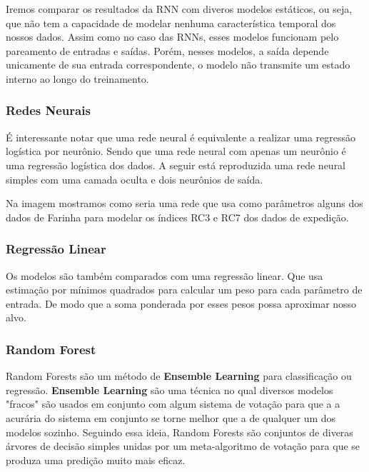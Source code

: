 \documentclass[a4paper]{article}
\begin{document}
Iremos comparar os resultados da RNN com diveros modelos estáticos, ou seja, que não tem a capacidade de modelar nenhuma característica temporal dos nossos dados. Assim como no caso das RNNs, esses modelos funcionam pelo pareamento de entradas e saídas. Porém, nesses modelos, a saída depende unicamente de sua entrada correspondente, o modelo não transmite um estado interno ao longo do treinamento.



\subsubsection{Redes Neurais}




É interessante notar que uma rede neural é equivalente a realizar uma regressão logística por neurônio. Sendo que uma rede neural com apenas um neurônio é uma regressão logística dos dados. A seguir está reproduzida uma rede neural simples com uma camada oculta e dois neurônios de saída.








Na imagem mostramos como seria uma rede que usa como parâmetros alguns dos dados de Farinha para modelar os índices RC3 e RC7 dos dados de expedição.

\bigskip
\subsubsection{Regressão Linear}
Os modelos são também comparados com uma regressão linear. Que usa estimação por mínimos quadrados para calcular um peso para cada parâmetro de entrada. De modo que a soma ponderada por esses pesos possa aproximar nosso alvo.


\subsubsection{Random Forest}

Random Forests são um método de \textbf{Ensemble Learning} para classificação ou regressão. \textbf{Ensemble Learning} são uma técnica no qual diversos modelos "fracos" são usados em conjunto com algum sistema de votação para que a a acurária do sistema em conjunto se torne melhor que a de qualquer um dos modelos sozinho. Seguindo essa ideia, Random Forests são conjuntos de diveras árvores de decisão simples unidas por um meta-algoritmo de votação para que se produza uma predição muito mais eficaz.
\end{document}
